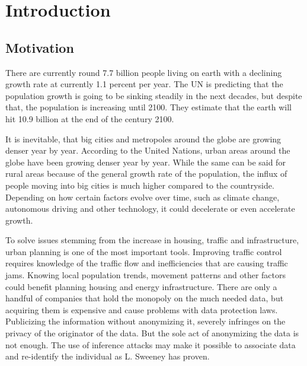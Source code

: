 
\chapter{Introduction}\label{chapter:introduction}
\section{Motivation}

There are currently round 7.7 billion people living on earth with a declining growth rate at currently 1.1 percent per year. The UN is predicting that the population growth is going to be sinking steadily in the next decades, but despite that, the population is increasing until 2100. They estimate that the earth will hit 10.9 billion at the end of the century 2100.

It is inevitable, that big cities and metropoles around the globe are growing denser year by year.
According to the United Nations, urban areas around the globe have been growing denser year by year. While the same can be said for rural areas because of the general growth rate of the population, the influx of people moving into big cities is much higher compared to the countryside.
Depending on how certain factors evolve over time, such as climate change, autonomous driving and other technology, it could decelerate or even accelerate growth.

To solve issues stemming from the increase in housing, traffic and infrastructure, urban planning is one of the most important tools. Improving traffic control requires knowledge of the traffic flow and inefficiencies that are causing traffic jams. Knowing local population trends, movement patterns and other factors could benefit planning housing and energy infrastructure. There are only a handful of companies that hold the monopoly on the much needed data, but acquiring them is expensive and cause problems with data protection laws. Publicizing the information without anonymizing it, severely infringes on the privacy of the originator of the data. But the sole act of anonymizing the data is not enough. The use of inference attacks may make it possible to associate data and re-identify the individual as L. Sweeney has proven.

